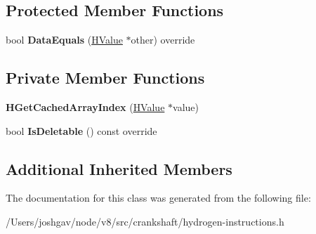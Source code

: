 \subsection*{Protected Member Functions}
\begin{DoxyCompactItemize}
\item 
bool {\bfseries Data\+Equals} (\hyperlink{classv8_1_1internal_1_1_h_value}{H\+Value} $\ast$other) override\hypertarget{classv8_1_1internal_1_1_h_get_cached_array_index_abb2894bf264857c5c601d5a9fae09fba}{}\label{classv8_1_1internal_1_1_h_get_cached_array_index_abb2894bf264857c5c601d5a9fae09fba}

\end{DoxyCompactItemize}
\subsection*{Private Member Functions}
\begin{DoxyCompactItemize}
\item 
{\bfseries H\+Get\+Cached\+Array\+Index} (\hyperlink{classv8_1_1internal_1_1_h_value}{H\+Value} $\ast$value)\hypertarget{classv8_1_1internal_1_1_h_get_cached_array_index_acad94bfd28293d6757a80847988b49f0}{}\label{classv8_1_1internal_1_1_h_get_cached_array_index_acad94bfd28293d6757a80847988b49f0}

\item 
bool {\bfseries Is\+Deletable} () const  override\hypertarget{classv8_1_1internal_1_1_h_get_cached_array_index_a4041483a898085d842222a9b81176366}{}\label{classv8_1_1internal_1_1_h_get_cached_array_index_a4041483a898085d842222a9b81176366}

\end{DoxyCompactItemize}
\subsection*{Additional Inherited Members}


The documentation for this class was generated from the following file\+:\begin{DoxyCompactItemize}
\item 
/\+Users/joshgav/node/v8/src/crankshaft/hydrogen-\/instructions.\+h\end{DoxyCompactItemize}

